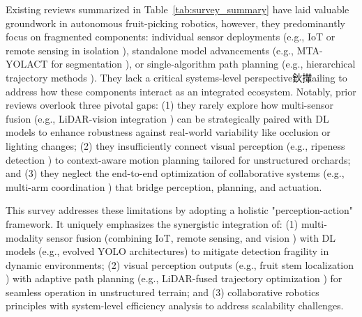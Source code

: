 \documentclass[a4paper,fleqn]{cas-dc}
\begin{document}
\iffalse
Existing reviews summarized in Table~\ref{tab:survey_summary} have laid valuable groundwork in autonomous fruit-picking robotics, however, they predominantly focus on fragmented components: individual sensor deployments (e.g., IoT or remote sensing in isolation \cite{mohamed2021smart,martos2021ensuring}), standalone model advancements (e.g., MTA-YOLACT for segmentation \cite{li2023mta}), or single-algorithm path planning (e.g., hierarchical trajectory methods \cite{liu2024hierarchical}). 
They lack a critical systems-level perspective鈥攆ailing to address how these components interact as an integrated ecosystem.
Notably, prior reviews overlook three pivotal gaps: (1) they rarely explore how multi-sensor fusion (e.g., LiDAR-vision integration \cite{liu2024hierarchical}) can be strategically paired with DL models to enhance robustness against real-world variability like occlusion or lighting changes; (2) they insufficiently connect visual perception (e.g., ripeness detection \cite{hou2023overview}) to context-aware motion planning tailored for unstructured orchards; and (3) they neglect the end-to-end optimization of collaborative systems (e.g., multi-arm coordination \cite{li2023multi}) that bridge perception, planning, and actuation.

This survey addresses these limitations by adopting a holistic "perception-action" framework. It uniquely emphasizes the synergistic integration of: (1) multi-modality sensor fusion (combining IoT, remote sensing, and vision \cite{mohamed2021smart,martos2021ensuring,liu2024hierarchical}) with DL models (e.g., evolved YOLO architectures) to mitigate detection fragility in dynamic environments; (2) visual perception outputs (e.g., fruit stem localization \cite{li2023mta}) with adaptive path planning (e.g., LiDAR-fused trajectory optimization \cite{liu2024hierarchical}) for seamless operation in unstructured terrain; and (3) collaborative robotics principles \cite{lytridis2021overview,li2023multi} with system-level efficiency analysis to address scalability challenges.
\end{document}
